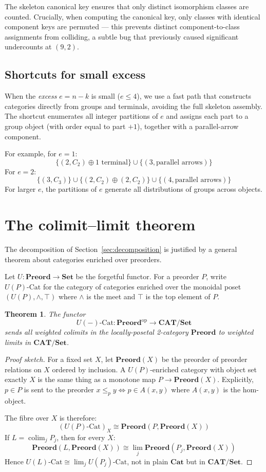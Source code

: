 \documentclass[12pt,a4paper]{amsart}
\newtheorem{theorem}{Theorem}[section]
\theoremstyle{definition}
\theoremstyle{remark}
\newcommand{\Set}{\mathbf{Set}}
\newcommand{\Preord}{\mathbf{Preord}}
\newcommand{\Cat}{\mathbf{Cat}}
\newcommand{\CAT}{\mathbf{CAT}}
\newcommand{\op}{\mathrm{op}}
\begin{document}
The skeleton canonical key ensures that only distinct isomorphism classes
are counted.  Crucially, when computing the canonical key, only classes
with identical component keys are permuted --- this prevents distinct
component-to-class assignments from colliding, a subtle bug that
previously caused significant undercounts at $(9,2)$.

\subsection{Shortcuts for small excess}

When the \emph{excess} $e = n - k$ is small ($e \leq 4$), we use a
fast path that constructs categories directly from groups and terminals,
avoiding the full skeleton assembly.  The shortcut enumerates all integer
partitions of $e$ and assigns each part to a group object (with order
equal to part $+ 1$), together with a parallel-arrow component.

For example, for $e = 1$:
\[
\{(2, C_2) \oplus 1\text{ terminal}\} \cup \{(3, \text{parallel arrows})\}
\]
For $e = 2$:
\[
\{(3, C_3)\} \cup \{(2, C_2) \oplus (2, C_2)\} \cup \{(4, \text{parallel arrows})\}
\]
For larger $e$, the partitions of $e$ generate all distributions of groups
across objects.

\section{The colimit--limit theorem}
\label{sec:theorem}

The decomposition of Section~\ref{sec:decomposition} is justified by a
general theorem about categories enriched over preorders.

Let $U : \Preord \to \Set$ be the forgetful functor.  For a preorder $P$,
write $U(P)\text{-Cat}$ for the category of categories enriched over the
monoidal poset $(U(P), \wedge, \top)$ where $\wedge$ is the meet and
$\top$ is the top element of $P$.

\begin{theorem}
  \label{thm:colimit-limit}
  The functor
  \[
  U(-)\text{-Cat} : \Preord^{\op} \longrightarrow \CAT/\Set
  \]
  sends all weighted colimits in the locally-posetal 2-category
  $\Preord$ to weighted limits in $\CAT/\Set$.
\end{theorem}

\begin{proof}[Proof sketch]
  For a fixed set $X$, let $\Preord(X)$ be the preorder of preorder
  relations on $X$ ordered by inclusion.  A $U(P)$-enriched category
  with object set exactly $X$ is the same thing as a monotone map
  $P \to \Preord(X)$.  Explicitly, $p \in P$ is sent to the preorder
  $x \leq_p y \iff p \in A(x,y)$ where $A(x,y)$ is the hom-object.

  The fibre over $X$ is therefore:
  \[
  (U(P)\text{-Cat})_X \cong \Preord(P, \Preord(X))
  \]
  If $L = \operatorname{colim}_j P_j$, then for every $X$:
  \[
  \Preord(L, \Preord(X)) \cong \lim_j \Preord(P_j, \Preord(X))
  \]
  Hence $U(L)\text{-Cat} \cong \lim_j U(P_j)\text{-Cat}$, not in
  plain $\Cat$ but in $\CAT/\Set$.
\end{proof}
\end{document}

